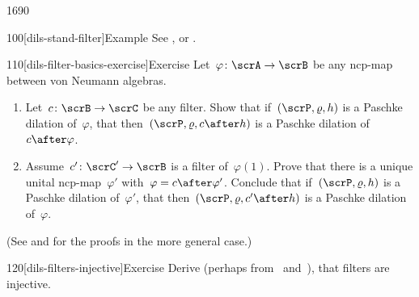 \begin{parsec}{1690}
\begin{point}{100}[dils-stand-filter]{Example}
    See , 
        or \cite[prop.~6]{westerbaan2016universal}.
\end{point}
\begin{point}{110}[dils-filter-basics-exercise]{Exercise}%
Let~$\varphi\colon \scrA \to \scrB$ be any ncp-map
    between von Neumann algebras.
\begin{enumerate}
\item
    Let~$c \colon \scrB \to \scrC$ be any filter.
    Show that if~$(\scrP, \varrho, h)$ is a Paschke dilation
            of~$\varphi$,
    that then~$(\scrP, \varrho, c \after h)$ is a Paschke dilation
        of~$c \after \varphi$.
\item
    Assume~$c'\colon \scrC' \to \scrB$ is a filter of~$\varphi(1)$.
    Prove that there is a unique unital ncp-map~$\varphi'$
        with~$\varphi = c \after \varphi'$.
    Conclude that if~$(\scrP, \varrho, h)$ is a Paschke dilation
            of~$\varphi'$,
            that then~$(\scrP, \varrho, c' \after h)$
            is a Paschke dilation of~$\varphi$.
\end{enumerate}
(See  and  for the proofs
        in the more general case.)
\end{point}
\begin{point}{120}[dils-filters-injective]{Exercise}%
Derive (perhaps from~ and~),
    that filters are injective.
\end{point}
\end{parsec}
